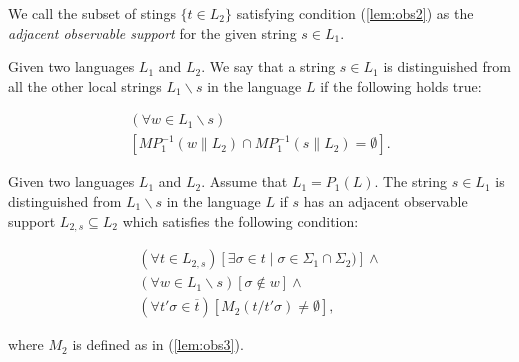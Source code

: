 \documentclass[letterpaper, 10pt, conference]{ieeeconf}
\begin{document}
We call the subset of stings $\{t \in L_2\}$ satisfying condition
(\ref{lem:obs2}) as the \emph{adjacent observable support} for the given string
$s \in L_1$.

\begin{definition} Given two languages $L_1$ and $L_2$. We say that a string $s
\in L_{1}$ is distinguished from all the other local strings $L_1\backslash s$
in the language $L$ if the following holds true:
\end{definition}
\begin{equation}
\label{def:dist}
\begin{array}{l}
  (\forall w \in L_1\backslash s)\\
  	\left[ MP_1^{-1}(w \parallel L_2) \cap MP_1^{-1}(s\parallel L_2) = \emptyset
  	\right].
\end{array}
\end{equation}

\begin{lemma}
\label{lem:distinguished}
Given two languages $L_1$ and $L_2$. Assume that $L_1 = P_1(L)$. The string $s
\in L_1$ is distinguished from $L_1\backslash s$ in the language $L$ if $s$ has
an adjacent observable support $L_{2,s} \subseteq L_2$ which
satisfies the following condition:
\end{lemma}
\begin{subequations}
\begin{align}
	(\forall t \in L_{2,s})
	\left[ \exists \sigma \in t \mid \sigma \in \Sigma_1 \cap \Sigma_2)\right]
	\land
	\label{lem:dist1}
	\\
	(\forall w \in L_1\backslash s)\left[\sigma \not \in w \right]
	\label{lem:dist2} \land
	\\
	(\forall t'\sigma \in \overline{t})
	[M_2(t / t'\sigma) \neq \emptyset]
	\label{lem:dist3},
\end{align}
\end{subequations}

where $M_2$ is defined as in (\ref{lem:obs3}). 
\end{document}
